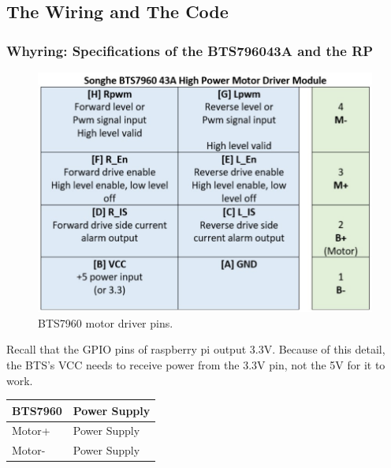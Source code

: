 \documentclass[a4paper, 10pt]{article}
\begin{document}
    \subsection{The Wiring and The Code}
    \subsubsection{Whyring: Specifications of the BTS796043A and the RP}

    \begin{figure}[!htb]
    \centering
    \includegraphics[width=\linewidth]{media/bts7960_pins.jpg}
    \caption{BTS7960 motor driver pins.}
    \label{fig:bts7960_pins}
    \end{figure}
    \newline
    
    Recall that the GPIO pins of raspberry pi output 3.3V. Because of this detail, the BTS's VCC needs to receive power from the 3.3V pin, not the 5V for it to work.

        \begin{table}[h]
        \centering
        \begin{tabular}{|l|l|}
        \hline
        \textbf{BTS7960} & \textbf{Power Supply} \\
        \hline
        Motor+ & Power Supply \\
        \hline
        Motor- & Power Supply \\
        \hline
        \end{tabular}
        \label{tab:motor}
        \end{table}
        
\end{document}
